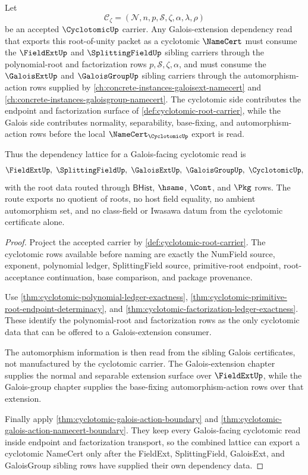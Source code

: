 \begin{theorem}
\label{thm:cyclotomic-galois-root-dependency-link}
Let
$$
\mathcal{C}_{\zeta}=(\mathcal{N},n,p,\mathcal{S},\zeta,\alpha,\lambda,\rho)
$$
be an accepted $\CyclotomicUp$ carrier. Any Galois-extension dependency read that exports this root-of-unity packet as a cyclotomic $\NameCert$ must consume the $\FieldExtUp$ and $\SplittingFieldUp$ sibling carriers through the polynomial-root and factorization rows $p,\mathcal{S},\zeta,\alpha$, and must consume the $\GaloisExtUp$ and $\GaloisGroupUp$ sibling carriers through the automorphism-action rows supplied by \autoref{ch:concrete-instances-galoisext-namecert} and \autoref{ch:concrete-instances-galoisgroup-namecert}. The cyclotomic side contributes the endpoint and factorization surface of \autoref{def:cyclotomic-root-carrier}, while the Galois side contributes normality, separability, base-fixing, and automorphism-action rows before the local $\NameCert_{\CyclotomicUp}$ export is read.

Thus the dependency lattice for a Galois-facing cyclotomic read is
$$
\FieldExtUp,\ \SplittingFieldUp,\ \GaloisExtUp,\ \GaloisGroupUp,\ \CyclotomicUp,
$$
with the root data routed through $\mathsf{BHist}$, $\hsame$, $\Cont$, and $\Pkg$ rows. The route exports no quotient of roots, no host field equality, no ambient automorphism set, and no class-field or Iwasawa datum from the cyclotomic certificate alone.
\end{theorem}
\begin{proof}
Project the accepted carrier by \autoref{def:cyclotomic-root-carrier}. The cyclotomic rows available before naming are exactly the NumField source, exponent, polynomial ledger, SplittingField source, primitive-root endpoint, root-acceptance continuation, base comparison, and package provenance.

Use \autoref{thm:cyclotomic-polynomial-ledger-exactness}, \autoref{thm:cyclotomic-primitive-root-endpoint-determinacy}, and \autoref{thm:cyclotomic-factorization-ledger-exactness}. These identify the polynomial-root and factorization rows as the only cyclotomic data that can be offered to a Galois-extension consumer.

The automorphism information is then read from the sibling Galois certificates, not manufactured by the cyclotomic carrier. The Galois-extension chapter supplies the normal and separable extension surface over $\FieldExtUp$, while the Galois-group chapter supplies the base-fixing automorphism-action rows over that extension.

Finally apply \autoref{thm:cyclotomic-galois-action-boundary} and \autoref{thm:cyclotomic-galois-action-namecert-boundary}. They keep every Galois-facing cyclotomic read inside endpoint and factorization transport, so the combined lattice can export a cyclotomic NameCert only after the FieldExt, SplittingField, GaloisExt, and GaloisGroup sibling rows have supplied their own dependency data.
\end{proof}
